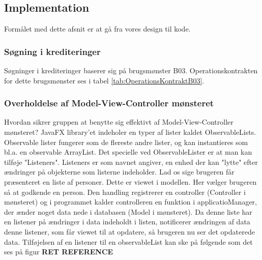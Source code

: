 \subsection{Implementation}

Formålet med dette afsnit er at gå fra vores design til kode.

\subsubsection{Søgning i krediteringer}%
\label{ssub:sogning_i_krediteringer}

Søgninger i krediteringer baserer sig på brugsmønster B03. Operationskontrakten
for dette brugsmønster ses i tabel \ref{tab:OperationsKontraktB03}.


\subsubsection{Overholdelse af Model-View-Controller mønsteret} Hvordan sikrer gruppen at benytte sig effektivt af Model-View-Controller mønsteret? 
JavaFX library'et indeholer en typer af lister kaldet ObservableLists. Observable lister fungerer som de flereste andre lister, og kan instantieres som bl.a. en observable ArrayList. Det specielle ved ObservableLister er at man kan tilføje "Listeners". Listeners er som navnet angiver, en enhed der kan "lytte" efter ændringer på objekterne som listerne indeholder. Lad os sige brugeren får præsenteret en liste af personer. Dette er viewet i modellen. Her vælger brugeren så at godkende en person. Den handling registrerer en controller (Controller i mønsteret) og i programmet kalder controlleren en funktion i applicatioManager, der ænder noget data nede i databasen (Model i mønsteret). Da denne liste har en listener på ændringer i data indeholdt i listen, notificerer ændringen af data denne listener, som får viewet til at opdatere, så brugeren nu ser det opdaterede data.
Tilføjelsen af en listener til en observableList kan ske på følgende som det ses på figur \textbf{RET REFERENCE}


 


